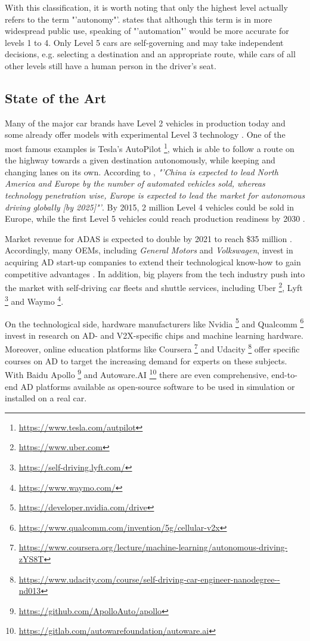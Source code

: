 With this classification, it is worth noting that only the highest level actually refers to the term "'autonomy"'. \cite{wood2012potential} states that although this term is in more widespread public use, speaking of "'automation"' would be more accurate for levels 1 to 4. Only Level 5 cars are self-governing and may take independent decisions, e.g. selecting a destination and an appropriate route, while cars of all other levels still have a human person in the driver's seat.

\subsection{State of the Art}
\label{subsec:background:state_of_the_art}
Many of the major car brands have Level 2 vehicles in production today and some already offer models with experimental Level 3 technology \cite{Frost&SulivanConsulting2018}. One of the most famous examples is Tesla's AutoPilot \footnote{\url{https://www.tesla.com/autpilot}}, which is able to follow a route on the highway towards a given destination autonomously, while keeping and changing lanes on its own. According to \cite{Frost&SulivanConsulting2018}, \textit{"'China is expected to lead North America and Europe by the number of automated vehicles sold, whereas technology penetration wise, Europe is expected to lead the market for autonomous driving globally [by 2025]"'}. By 2015, 2 million Level 4 vehicles could be sold in Europe, while the first Level 5 vehicles could reach production readiness by 2030 \cite{McKinseyCenterforFutureMobility2019}. 

Market revenue for ADAS is expected to double by 2021 to reach \$35 million \cite{McKinseyCenterforFutureMobility2019}. Accordingly, many OEMs, including \textit{General Motors} and \textit{Volkswagen}, invest in acquiring AD start-up companies to extend their technological know-how to gain competitive advantages \cite{Korosec, Korosec2019}. In addition, big players from the tech industry push into the market with self-driving car fleets and shuttle services, including Uber \footnote{\url{https://www.uber.com}}, Lyft \footnote{\url{https://self-driving.lyft.com/}} and Waymo \footnote{\url{https://www.waymo.com/}}. 

On the technological side, hardware manufacturers like Nvidia \footnote{\url{https://developer.nvidia.com/drive}} and Qualcomm \footnote{\url{https://www.qualcomm.com/invention/5g/cellular-v2x}} invest in research on AD- and V2X-specific chips and machine learning hardware. Moreover, online education platforms like Coursera \footnote{\url{https://www.coursera.org/lecture/machine-learning/autonomous-driving-zYS8T}} and Udacity \footnote{\url{https://www.udacity.com/course/self-driving-car-engineer-nanodegree--nd013}} offer specific courses on AD to target the increasing demand for experts on these subjects. With Baidu Apollo \footnote{\url{https://github.com/ApolloAuto/apollo}} and Autoware.AI \footnote{\url{https://gitlab.com/autowarefoundation/autoware.ai}} there are even comprehensive, end-to-end AD platforms available as open-source software to be used in simulation or installed on a real car. 

